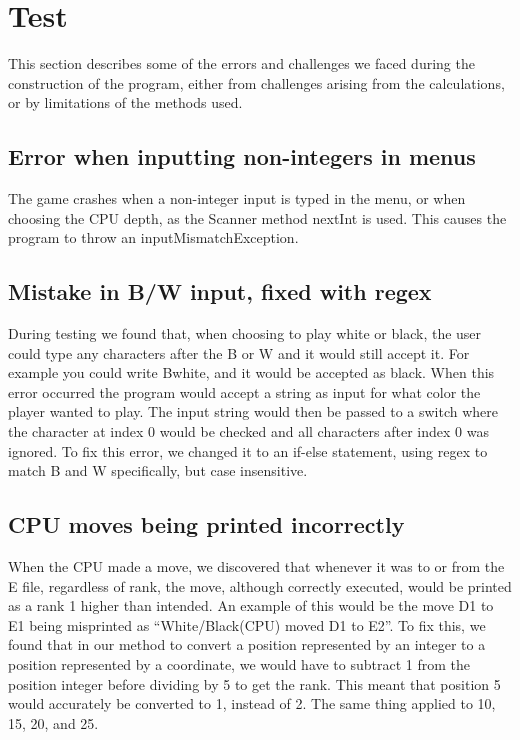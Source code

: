 \documentclass[12pt, a4paper]{article}
\begin{document}
\section{Test}
This section describes some of the errors and challenges we faced during the construction of the program, either from challenges arising from the calculations, or by limitations of the methods used.

\subsection{Error when inputting non-integers in menus}
The game crashes when a non-integer input is typed in the menu, or when choosing the CPU depth, as the Scanner method nextInt is used. This causes the program to throw an inputMismatchException.

\subsection{Mistake in B/W input, fixed with regex}
During testing we found that, when choosing to play white or black, the user could type any characters after the B or W and it would still accept it. For example you could write Bwhite, and it would be accepted as black.
When this error occurred the program would accept a string as input for what color the player wanted to play. The input string would then be passed to a switch where the character at index 0 would be checked and all characters after index 0 was ignored.
To fix this error, we changed it to an if-else statement, using regex to match B and W specifically, but case insensitive.

\subsection{CPU moves being printed incorrectly}
When the CPU made a move, we discovered that whenever it was to or from the E file, regardless of rank, the move, although correctly executed, would be printed as a rank 1 higher than intended. An example of this would be the move D1 to E1 being misprinted as “White/Black(CPU) moved D1 to E2”. To fix this, we found that in our method to convert a position represented by an integer to a position represented by a coordinate, we would have to subtract 1 from the position integer before dividing by 5 to get the rank. This meant that position 5 would accurately be converted to 1, instead of 2. The same thing applied to 10, 15, 20, and 25.
\end{document}
